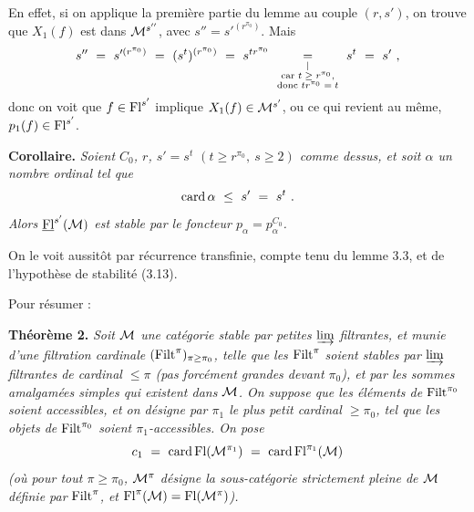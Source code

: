 En effet, si on applique la première partie du lemme au couple $(r,s')$, on trouve que $X_1(f)$ est dans $\mathcal{M}^{s''}$, avec $s''=s'^{(r^{\pi_0})}$. Mais
\[
s''\ =\ s'^{(r^{\pi_0})}\ =\ (s^t)^{(r^{\pi_0})}\ =\ s^{tr^{\pi_0}}\ \underset{\substack{\vert\\ \text{\scriptsize car $t\geq r^{\pi_0}$,}\\ \text{\scriptsize donc $tr^{\pi_0}=t$}}}{=}\ s^t\ =\ s'\ ,
\]
donc on voit que $f\in\mathrm{Fl}^{s'}$ implique $X_1(f)\in\mathcal{M}^{s'}$, ou ce qui revient au même, $p_1(f)\in\mathrm{Fl}^{s'}$.

\textbf{Corollaire.} \textit{Soient $C_0$, $r$, $s'=s^t$ $(t\geq r^{\pi_0},\ s\geq 2)$ comme dessus, et soit $\alpha$ un nombre ordinal tel que}
\[
\card\alpha\ \leq\ s'\ =\ s^t\ .
\]
\textit{Alors $\underline{\mathrm{Fl}}^{s'}(\mathcal{M})$ est stable par le foncteur $p_\alpha=p_\alpha^{C_0}$.}

On le voit aussitôt par récurrence transfinie, compte tenu du lemme 3.3, et de l'hypothèse de stabilité (3.13).

Pour résumer :

\textbf{Théorème 2.} \textit{Soit $\mathcal{M}$ une catégorie stable par petites $\varinjlim$ filtrantes, et munie d'une filtration cardinale} $(\mathrm{Filt}^\pi)_{\pi\geq\pi_0}$\textit{, telle que les} $\mathrm{Filt}^\pi$ \textit{soient stables par $\varinjlim$ filtrantes de cardinal $\leq\pi$ (pas forcément grandes devant $\pi_0$), et par les sommes amalgamées simples qui existent dans $\mathcal{M}$. On suppose que les éléments de} $\mathrm{Filt}^{\pi_0}$ \textit{soient accessibles, et on désigne par $\pi_1$ le plus petit cardinal $\geq\pi_0$, tel que les objets de} $\mathrm{Filt}^{\pi_0}$ \textit{soient $\pi_1$-accessibles. On pose} 
\[
c_1\ =\ \card\Fl(\M^{\pi_1})\ =\ \card\Fl^{\pi_1}(\M)
\]
\textit{(où pour tout $\pi\geq\pi_0$, $\mathcal{M}^\pi$ désigne la sous-catégorie strictement pleine de $\mathcal{M}$ définie par} $\mathrm{Filt}^\pi$\textit{, et} $\mathrm{Fl}^\pi(\mathcal{M})=\mathrm{Fl}(\mathcal{M}^\pi)$\textit{).}

